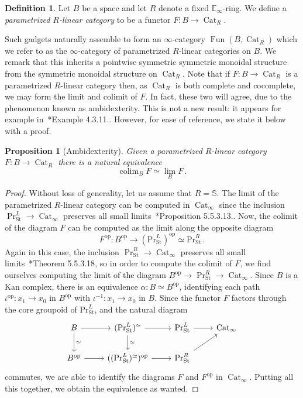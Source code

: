 \documentclass[10pt]{amsart}
\theoremstyle{plain}
\newtheorem{proposition}[theorem]{Proposition}
\theoremstyle{definition}
\newtheorem{definition}[theorem]{Definition}
\DeclareMathOperator*{\colim}{colim}
\DeclareMathOperator{\Fun}{Fun}
\DeclareMathOperator{\Cat}{Cat}
\newcommand{\St}{\mathrm{St}}
\newcommand{\oop}{\mathrm{op}}
\newcommand{\bE}{\mathbb{E}}
\newcommand{\bS}{\mathbb{S}}
\begin{document}
\begin{definition}
Let $B$ be a space and let $R$ denote a fixed $\bE_\infty$-ring.
We define a \emph{parametrized $R$-linear category} to be a functor $F: B \to  \Cat_{R}$.
\end{definition}

Such gadgets naturally assemble to form an $\infty$-category $\Fun(B, \Cat_{R})$ which we refer to as the $\infty$-category of parametrized $R$-linear categories on $B$.
We remark that this inherits a pointwise symmetric symmetric monoidal structure from the symmetric monoidal structure on $ \Cat_{R}$.
Note that if $F: B \to \Cat_{R}$ is a parametrized $R$-linear category then, as $\Cat_R$ is both complete and cocomplete, we may form the limit and colimit of $F$.
In fact, these two will agree, due to the phenomenon known as ambidexterity.
This is not a new result: it appears for example in~\cite{HL13}*{Example 4.3.11.}.
However, for ease of reference, we state it below with a proof.

\begin{proposition}[Ambidexterity] \label{ambidexterity in Prl}
Given a parametrized $R$-linear category $F : B \to \Cat_R$ there is a natural equivalence
\[
\colim_B F \simeq \lim_B F \,.
\]
\end{proposition}

\begin{proof}
Without loss of generality, let us assume that $R = \bS$.
The limit of the parametrized $R$-linear category can be computed in $\Cat_\infty$ since the inclusion $\Pr^{L}_{\St} \to \Cat_{\infty}$ preserves all small limits~\cite{HTT}*{Proposition 5.5.3.13.}.
Now, the colimit of the diagram $F$ can be computed as the limit along the opposite diagram
\[
F^{\oop}: B^{\oop} \to (\mathrm{Pr}^{L}_{\St})^{\oop} \simeq \mathrm{Pr}^{R}_{\St} \,.
\]
Again in this case, the inclusion $\Pr^{R}_{\St} \to \Cat_{\infty}$ preserves all small limits~\cite{HTT}*{Theorem 5.5.3.18}, so in order to compute the colimit of $F$, we find ourselves computing the limit of the diagram $B^{\oop} \to \Pr^{R}_{\St} \to \Cat_\infty$.
Since $B$ is a Kan complex, there is an equivalence $\alpha : B \simeq B^{\oop}$, identifying each path $\iota^{\oop} : x_1 \to x_0$ in $B^{\oop}$ with $\iota^{-1}: x_1 \to x_0$ in $B$.
Since the functor $F$ factors through the core groupoid of $\mathrm{Pr}^{L}_{\St}$, and the natural diagram
\[
\begin{tikzcd}
  B \arrow[r] \arrow[d,"\simeq"] & (\mathrm{Pr}^L_{\St})^{\simeq} \arrow[r] \arrow[d,"\simeq"] & \mathrm{Pr}^{L}_{\St} \arrow[r] & \Cat_{\infty} \\
  B^{\oop} \arrow[r] & ((\mathrm{Pr}^{L}_{\St})^{\simeq})^{\oop} \arrow[r] & \mathrm{Pr}^R_{\St} \arrow[ur]
\end{tikzcd}
\]
commutes, we are able to identify the diagrams $F$ and $F^{\oop}$ in $\Cat_{\infty}$.
Putting all this together, we obtain the equivalence as wanted.
\end{proof}
\end{document}
